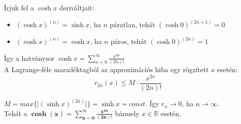 \documentclass[tikz,12pt,margin=0px]{article}
\newcommand\ddfrac[2]{\frac{\displaystyle #1}{\displaystyle #2}}
\begin{document}
        \noindent Írjuk fel a $\cosh x$ deriváltjait:

        \begin{itemize}
            \item $(\cosh x)^{(n)} = \sinh x$, ha $n$ páratlan, tehát $(\cosh 0)^{(2n+1)} = 0$
            \item $(\cosh x)^{(n)} = \cosh x$, ha $n$ páros, tehát $(\cosh 0)^{(2n)} = 1$
        \end{itemize}

        \noindent Így a hatványsor $\cosh x = \sum\limits_{n=0}^{\infty}\ddfrac{x^{2n}}{(2n)!}$\\

        \noindent A Lagrange-féle maradéktagból az approximációs hiba egy rögzített $x$ esetén:
        \[
            r_{2n}(x) \leq M \cdot \ddfrac{x^{2n}}{(2n)!}
        \]

        \noindent $M = max\Big\{\big|(\sinh x)^{(2n)}\big|\Big\} = \sinh x = const$. Így $r_{n} \to 0$, ha $n \to \infty$.\\

        \noindent Tehát a $\boldsymbol{\cosh(x) = \sum\limits_{n=0}^{\infty}\ddfrac{x^{2n}}{(2n)!}}$ bármely $x \in \mathbb{R}$ esetén.\\

      \begin{center}
        \end{center}
	
\end{document}
